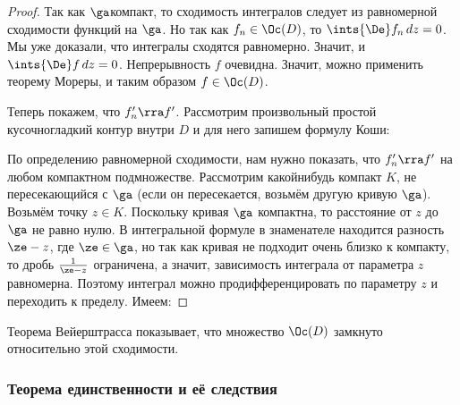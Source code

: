 \documentclass[a4paper]{article}
\begin{document}
\begin{proof}
Так как $\ga$\т компакт, то сходимость интегралов следует из равномерной сходимости функций на $\ga$.
Но так как $f_n \in \Oc(D)$, то $\ints{\De} f_n\,dz=0$. Мы уже доказали, что интегралы сходятся равномерно.
Значит, и $\ints{\De} f\,dz=0$. Непрерывность $f$ очевидна. Значит, можно применить теорему Мореры,
и таким образом $f \in \Oc(D)$.

Теперь покажем, что $f'_n \rra f'$. Рассмотрим произвольный простой кусочно\д гладкий контур внутри $D$ и для
него запишем формулу Коши:

По определению равномерной сходимости, нам нужно показать, что $f'_n \rra f'$ на любом компактном подмножестве.
Рассмотрим какой\д нибудь компакт $K$, не пересекающийся с $\ga$ (если он пересекается, возьмём другую кривую $\ga$).
Возьмём точку $z \in K$. Поскольку кривая $\ga$ компактна, то расстояние от $z$ до $\ga$ не равно нулю.
В интегральной формуле в знаменателе находится разность $\ze-z$, где $\ze \in \ga$, но так как кривая не подходит
очень близко к компакту, то дробь $\frac{1}{\ze-z}$ ограничена, а значит, зависимость интеграла от
параметра $z$ равномерна. Поэтому интеграл можно продифференцировать по параметру $z$ и переходить к пределу.
Имеем:
\hfill\end{proof}

Теорема Вейерштрасса показывает, что множество $\Oc(D)$ замкнуто относительно этой сходимости.

\subsubsection{Теорема единственности и её следствия}
\end{document}
